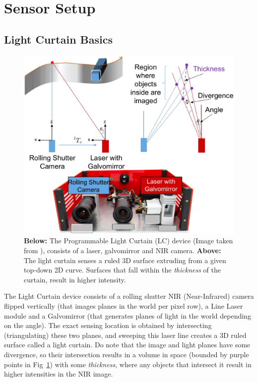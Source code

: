 
\section{Sensor Setup}

\subsection{Light Curtain Basics}

\begin{figure}[h]
   \centering
   \begin{minipage}{0.5\textwidth}
       \centering
       \includegraphics[width=1.0\textwidth]{figures/LC.pdf} %
   \end{minipage}\hfill
   \centering
   \caption{ \textbf{Below:}  The Programmable Light Curtain (LC) device (Image taken from \cite{bartels2019Agile}), consists of a laser, galvomirror and NIR camera. \textbf{Above:} The light curtain senses a ruled 3D surface extruding from a given top-down 2D curve. Surfaces that fall within the \textit{thickness} of the curtain, result in higher intensity.}
   \label{fig:lcdevice} 
\end{figure}

The Light Curtain device consists of a rolling shutter NIR (Near-Infrared) camera flipped vertically (that images planes in the world per pixel row), a Line Laser module and a Galvomirror (that generates planes of light in the world depending on the angle). The exact sensing location is obtained by intersecting (triangulating) these two planes, and sweeping this laser line creates a 3D ruled surface called a light curtain. Do note that the image and light planes have some divergence, so their intersection results in a volume in space (bounded by purple points in Fig~\ref{fig:lcdevice})  with some \textit{thickness}, where any objects that intersect it result in higher intensities in the NIR image.

